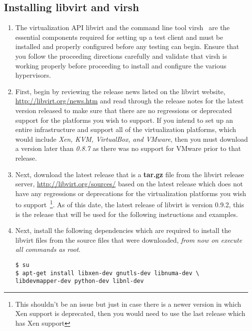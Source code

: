 \subsection{Installing libvirt and virsh}
\label{sec:debianvirsh}
\begin{enumerate}
\item	The virtualization API libvirt and the command line tool virsh~\cite{libvirt} are the essential components required 
		for setting up a test client and must be installed and properly configured before any testing can begin. Ensure that
		you follow the proceeding directions carefully and validate that virsh is working properly before proceeding to 
		install and configure the various hypervisors.
		
\item	First, begin by reviewing the release news listed on the libvirt website, \url{http://libvirt.org/news.htm} and read 
		through the release notes for the latest version released to make sure that there are no regressions or deprecated 
		support for the platforms you wish to support. If you intend to set up an entire infrastructure and support all of the
		\cernvm virtualization platforms, which would include \emph{Xen, KVM, VirtualBox, and VMware}, then you must download
		a version later than \emph{0.8.7} as there was no support for VMware prior to that release.

\item	Next, download the latest release that is a {\bf tar.gz} file from the libvirt release server, 
		\url{http://libvirt.org/sources/} based on the latest release which does not have any regressions or deprecations for
		the virtualization platforms you wish to support~\footnote{This shouldn't be an issue but just in case there is a 
		newer version in which Xen support is deprecated, then you would need to use the last release which has Xen support}.
		As of this date, the latest release of libvirt is version 0.9.2, this is the release that will be used for the
		following instructions and examples.
		
\item	Next, install the following dependencies which are required to install the libvirt files from the source files
		that were downloaded, \emph{from now on execute all commands as root}.

\lstset{language=bash,caption=Install Dependencies}
\begin{lstlisting}
$ su
$ apt-get install libxen-dev gnutls-dev libnuma-dev \
libdevmapper-dev python-dev libnl-dev
\end{lstlisting}
		

\end{enumerate}
